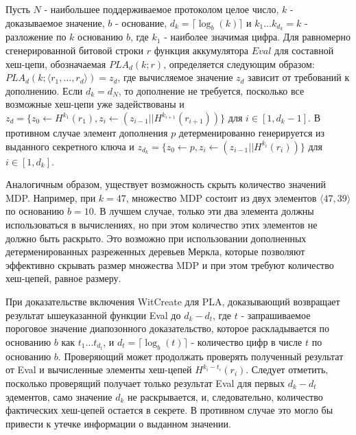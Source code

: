 \begin{definition}
	Пусть $N$ - наибольшее поддерживаемое протоколом целое число, $k$ - доказываемое значение, $b$ - основание, $d_k = \lceil \log_b(k) \rceil$ и $k_1 \dots k_{d_k} = k$ - разложение по $k$ основанию $b$, где $k_1$ - наиболее значимая цифра.
	Для равномерно сгенерированной битовой строки $r$ функция аккумулятора $Eval$ для составной хеш-цепи, обозначаемая $PLA_d(k; r)$, определяется следующим образом: $PLA_d(k; \langle r_1, \dots, r_d \rangle) = z_d$, где вычисляемое значение $z_d$ зависит от требований к дополнению.
	Если $d_k = d_N$, то дополнение не требуется, посколько все возможные хеш-цепи уже задействованы и $z_d = \{z_0 \leftarrow H^{k_1}(r_1), z_i \leftarrow (z_{i - 1} || H^{k_{i + 1}}(r_{i + 1}))\}$ для $i \in [1, d_k - 1]$.
	В противном случае элемент дополнения $p$ детерменированно генерируется из выданного секретного ключа и $z_{d_k} = \{z_0 \leftarrow p, z_i \leftarrow (z_{i - 1} || H^{k_i}(r_i))\}$ для $i \in [1, d_k]$.
\end{definition}

Аналогичным образом, уществует возможность скрыть количество значений MDP.
Например, при $k = 47$, множество MDP состоит из двух элементов $\langle 47, 39 \rangle$ по основанию $b = 10$.
В лучшем случае, только эти два элемента должны использоваться в вычислениях, но при этом количество этих элементов не должно быть раскрыто.
Это возможно при использовании дополненных детерменированных разреженных деревьев Меркла, которые позволяют эффективно скрывать размер множества MDP и при этом требуют количество хеш-цепей, равное размеру.

При доказательстве включения WitCreate для PLA, доказывающий возвращает результат ышеуказанной функции Eval до $d_k - d_t$, где $t$ - запрашиваемое пороговое значение диапозонного доказательство, которое раскладывается по основанию $b$ как $t_1 \dots t_{d_t}$, и $d_t = \lceil \log_b(t) \rceil$ - количество цифр в числе $t$ по основанию $b$.
Проверяющий может продолжать проверять полученный результат от Eval и вычисленные элементы хеш-цепей $H^{k_i - t_i}(r_i)$.
Следует отметить, посколько проверящий получает только результат Eval для первых $d_k - d_t$ эдементов, само значение $d_k$ не раскрывается, и, следовательно, количество фактических хеш-цепей остается в секрете.
В противном случае это могло бы привести к утечке информации о выданном значении.

